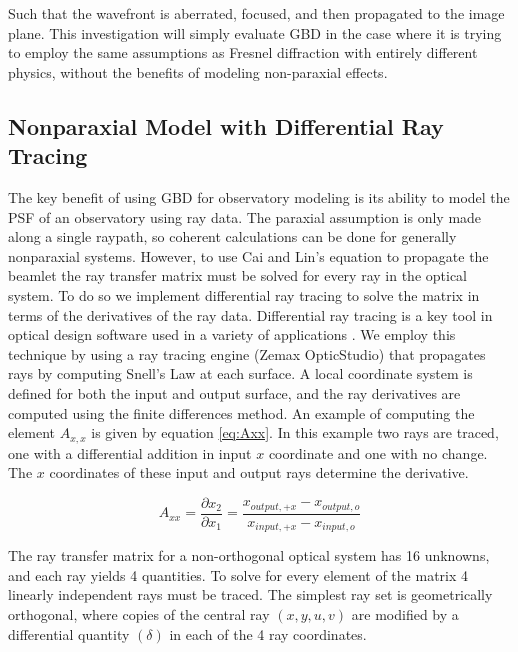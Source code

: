 Such that the wavefront is aberrated, focused, and then propagated to the image plane. This investigation will simply evaluate GBD in the case where it is trying to employ the same assumptions as Fresnel diffraction with entirely different physics, without the benefits of modeling non-paraxial effects. 

\subsection{Nonparaxial Model with Differential Ray Tracing}

The key benefit of using GBD for observatory modeling is its ability to model the PSF of an observatory using ray data. The paraxial assumption is only made along a single raypath, so coherent calculations can be done for generally nonparaxial systems. However, to use Cai and Lin's equation to propagate the beamlet the ray transfer matrix must be solved for every ray in the optical system. To do so we implement differential ray tracing to solve the matrix in terms of the derivatives of the ray data. Differential ray tracing is a key tool in optical design software used in a variety of applications \cite{Stone:97,stone_tech_memo}. We employ this technique by using a ray tracing engine (Zemax OpticStudio) that propagates rays by computing Snell's Law at each surface. A local coordinate system is defined for both the input and output surface, and the ray derivatives are computed using the finite differences method. An example of computing the element $A_{x,x}$ is given by equation \ref{eq:Axx}. In this example two rays are traced, one with a differential addition in input $x$ coordinate and one with no change. The $x$ coordinates of these input and output rays determine the derivative. 

\begin{equation}
    A_{xx} = \frac{\partial x_{2}}{\partial x_{1}} = \frac{x_{output,+x} - x_{output,o}}{x_{input,+x} - x_{input,o}}
    \label{eq:Axx}
\end{equation}

The ray transfer matrix for a non-orthogonal optical system has 16 unknowns, and each ray yields 4 quantities. To solve for every element of the matrix 4 linearly independent rays must be traced. The simplest ray set is geometrically orthogonal\cite{Greynolds86}, where copies of the central ray $(x,y,u,v)$ are modified by a differential quantity $(\delta)$ in each of the 4 ray coordinates.

